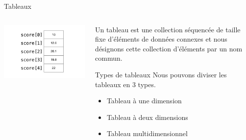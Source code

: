 \documentclass[
  10pt,
  french,
  ignorenonframetext,
  aspectratio=169,
]{beamer}
\providecommand{\tightlist}{%
  \setlength{\itemsep}{0pt}\setlength{\parskip}{0pt}}
\begin{document}
\begin{frame}{Tableaux}
\protect\hypertarget{tableaux}{}
\begin{columns}[T]
\begin{column}{0.48\textwidth}
\includegraphics{img/1d-array-filled.png}
\end{column}

\begin{column}{0.48\textwidth}
Un tableau est une collection séquencée de taille fixe d'éléments de
données connexes et nous désignons cette collection d'éléments par un
nom commun.

\begin{block}{Types de tableaux}
\protect\hypertarget{types-de-tableaux}{}
Nous pouvons diviser les tableaux en 3 types.

\begin{itemize}
\tightlist
\item
  Tableau à une dimension
\item
  Tableau à deux dimensions
\item
  Tableau multidimensionnel
\end{itemize}
\end{block}
\end{column}
\end{columns}
\end{frame}
\end{document}
